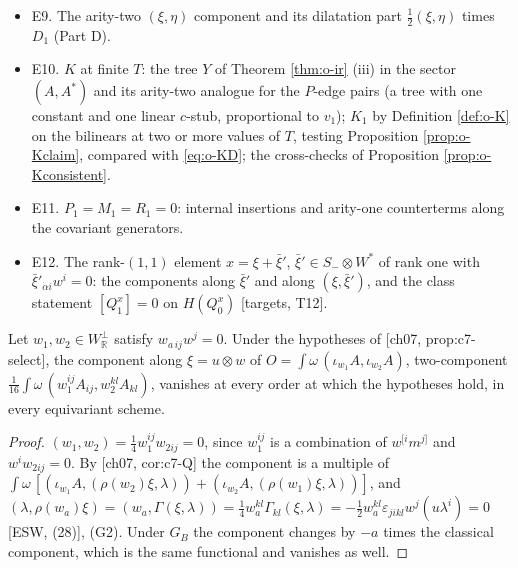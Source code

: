 \begin{itemize}
\item E9. The arity-two $(\xi,\eta)$ component and its dilatation part $\tfrac12(\xi,\eta)$ times $D_1$ (Part D).
\item E10. $K$ at finite $T$: the tree $Y$ of Theorem \ref{thm:o-ir} (iii) in the sector $(A,A^*)$ and its arity-two analogue for the $P$-edge pairs (a tree with one constant and one linear $c$-stub, proportional to $v_1$); $K_1$ by Definition \ref{def:o-K} on the bilinears at two or more values of $T$, testing Proposition \ref{prop:o-Kclaim}, compared with \eqref{eq:o-KD}; the cross-checks of Proposition \ref{prop:o-Kconsistent}.
\item E11. $P_1=M_1=R_1=0$: internal insertions and arity-one counterterms along the covariant generators.
\item E12. The rank-$(1,1)$ element $x=\xi+\bar\xi'$, $\bar\xi'\in S_-\otimes W^*$ of rank one with $\bar\xi'_{\dot\alpha i}w^i=0$: the components along $\bar\xi'$ and along $(\xi,\bar\xi')$, and the class statement $[Q_1^x]=0$ on $H(Q_0^x)$ [targets, T12].
\end{itemize}

\begin{proposition}
\label{prop:o-planevanish}
Let $w_1,w_2\in W_{\mathbb R}^\perp$ satisfy $w_{a\,ij}w^j=0$. Under the hypotheses of [ch07, prop:c7-select], the component along $\xi=u\otimes w$ of $O=\int\omega\,(\iota_{w_1}A,\iota_{w_2}A)$, two-component $\tfrac1{16}\int\omega\,(w_1^{ij}A_{ij},w_2^{kl}A_{kl})$, vanishes at every order at which the hypotheses hold, in every equivariant scheme.
\end{proposition}

\begin{proof}
$(w_1,w_2)=\tfrac14w_1^{ij}w_{2ij}=0$, since $w_1^{ij}$ is a combination of $w^{[i}m^{j]}$ and $w^iw_{2ij}=0$. By [ch07, cor:c7-Q] the component is a multiple of $\int\omega\,[(\iota_{w_1}A,(\rho(w_2)\xi,\lambda))+(\iota_{w_2}A,(\rho(w_1)\xi,\lambda))]$, and $(\lambda,\rho(w_a)\xi)=(w_a,\Gamma(\xi,\lambda))=\tfrac14w_a^{kl}\Gamma_{kl}(\xi,\lambda)=-\tfrac12w_a^{kl}\varepsilon_{jikl}w^j(u\lambda^i)=0$ [ESW, (28)], (G2). Under $G_B$ the component changes by $-a$ times the classical component, which is the same functional and vanishes as well.
\end{proof}
